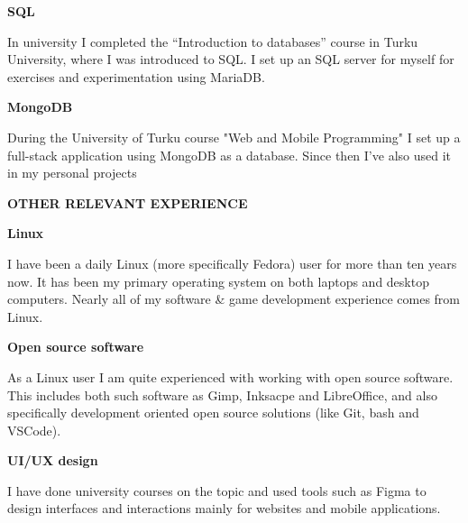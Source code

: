 \documentclass{article}
\begin{document}
\textbf{\large SQL}
\vspace{0.5cm}

\noindent In university I completed the “Introduction to databases” course in 
Turku University, where I was introduced to SQL. I set up an SQL server for 
myself for exercises and experimentation using MariaDB.

\vspace{0.5cm}
\textbf{\large MongoDB}
\vspace{0.5cm}

\noindent During the University of Turku course "Web and Mobile Programming" I 
set up a full-stack application using MongoDB as a database. Since then I've 
also used it in my personal projects

\vspace{1cm}
\textbf{\LARGE OTHER RELEVANT EXPERIENCE}
\vspace{0.5cm}

\textbf{\large Linux}
\vspace{0.5cm}

\noindent I have been a daily Linux (more specifically Fedora) user for more 
than ten years now. It has been my primary operating system on both laptops 
and desktop computers. Nearly all of my software & game development 
experience comes from Linux.

\vspace{0.5cm}
\textbf{\large Open source software}
\vspace{0.5cm}

\noindent As a Linux user I am quite experienced with working with open 
source software. This includes both such software as Gimp, Inksacpe and 
LibreOffice, and also specifically development oriented open source solutions 
(like Git, bash and VSCode).

\vspace{0.5cm}
\textbf{\large UI/UX design}
\vspace{0.5cm}

\noindent I have done university courses on the topic and used tools such as 
Figma to design interfaces and interactions mainly for websites and mobile 
applications.
\end{document}
